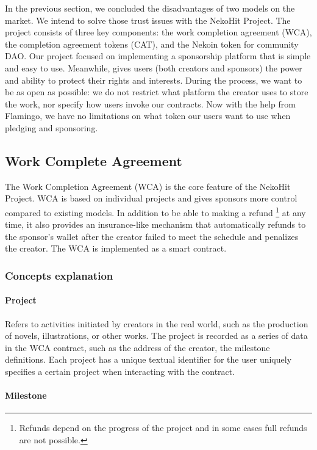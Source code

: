 In the previous section, we concluded the disadvantages of two models on the market.
We intend to solve those trust issues with the NekoHit Project.
The project consists of three key components: the work completion agreement
(WCA), the completion agreement tokens (CAT), and the Nekoin token for community DAO\@.
Our project focused on implementing a sponsorship platform that is simple and
easy to use.
Meanwhile, gives users (both creators and sponsors) the power and ability to
protect their rights and interests.
During the process, we want to be as open as possible: we do not restrict
what platform the creator uses to store the work, nor specify how users invoke
our contracts. Now with the help from Flamingo, we have no limitations on what
token our users want to use when pledging and sponsoring.

\subsection{Work Complete Agreement}\label{subsec:wca}

The Work Completion Agreement (WCA) is the core feature of the NekoHit Project.
WCA is based on individual projects and gives sponsors more control compared
to existing models.
In addition to be able to making a refund \footnote{
    Refunds depend on the progress of the project and
    in some cases full refunds are not possible.
} at any time, it also provides an insurance-like mechanism that automatically
refunds to the sponsor's wallet after the creator failed to meet the schedule
and penalizes the creator.
The WCA is implemented as a smart contract.

\subsubsection{Concepts explanation}

\paragraph{Project}

Refers to activities initiated by creators in the real world, such as the production
of novels, illustrations, or other works.
The project is recorded as a series of data in the WCA contract, such as the
address of the creator, the milestone definitions.
Each project has a unique textual identifier for the user uniquely specifies a
certain project when interacting with the contract.

\paragraph{Milestone}

